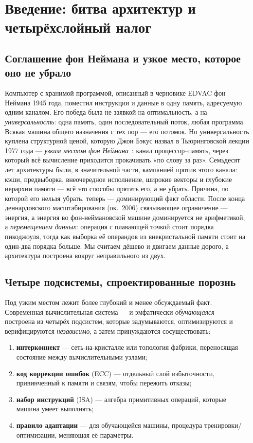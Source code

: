 \section{Введение: битва архитектур и четырёхслойный налог}
\label{sec:intro}

\subsection{Соглашение фон Неймана и узкое место, которое оно не убрало}

Компьютер с хранимой программой, описанный в черновике EDVAC фон Неймана
1945 года, поместил инструкции и данные в одну память, адресуемую одним
каналом. Его победа была не заявкой на оптимальность, а на \emph{универсальность}:
одна память, один последовательный поток, любая программа. Всякая машина
общего назначения с тех пор --- его потомок. Но универсальность куплена
структурной ценой, которую Джон Бэкус назвал в Тьюринговской лекции 1977 года
--- \emph{узким местом фон Неймана}~\cite{backus1977}: канал процессор--память,
через который всё вычисление приходится прокачивать «по слову за раз». Семьдесят
лет архитектуры были, в значительной части, кампанией против этого канала:
кэши, предвыборка, внеочередное исполнение, широкие векторы и глубокие иерархии
памяти --- всё это способы прятать его, а не убрать. Причина, по которой его
нельзя убрать, теперь --- доминирующий факт области. После конца деннардовского
масштабирования (ок.\ 2006) связывающее ограничение --- энергия, а энергия во
фон-неймановской машине доминируется не арифметикой, а \emph{перемещением
данных}: операция с плавающей точкой стоит порядка пикоджоуля, тогда как
выборка её операндов из внекристальной памяти стоит на один-два порядка
больше. Мы считаем дёшево и двигаем данные дорого, а архитектура построена
вокруг неправильного из двух.

\subsection{Четыре подсистемы, спроектированные порознь}

Под узким местом лежит более глубокий и менее обсуждаемый факт. Современная
вычислительная система --- и эмфатически \emph{обучающаяся} --- построена из
четырёх подсистем, которые задумываются, оптимизируются и верифицируются
\emph{независимо}, а затем принуждаются сосуществовать:

\begin{enumerate}[leftmargin=1.7em,itemsep=1pt]
  \item \textbf{интерконнект} --- сеть-на-кристалле или топология фабрики,
        переносящая состояние между вычислительными узлами;
  \item \textbf{код коррекции ошибок} (ECC) --- отдельный слой избыточности,
        привинченный к памяти и связям, чтобы пережить отказы;
  \item \textbf{набор инструкций} (ISA) --- алгебра примитивных операций,
        которые машина умеет выполнять;
  \item \textbf{правило адаптации} --- для обучающейся машины, процедура
        тренировки/оптимизации, меняющая её параметры.
\end{enumerate}


